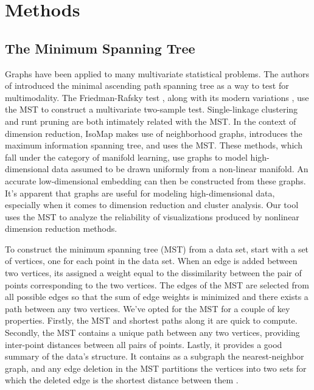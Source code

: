 \documentclass{article}
\begin{document}
\section{Methods}

\subsection{The Minimum Spanning Tree}
Graphs have been applied to many multivariate statistical problems. The authors of \cite{MAP test} introduced the minimal ascending path spanning tree as a way to test for multimodality. The Friedman-Rafsky test \cite{Friedman-Rafsky test}, along with its modern variations \cite{Friedman-Rafsky variation 1, Friedman-Rafsky variation 2, Friedman-Rafsky variation 3}, use the MST to construct a multivariate two-sample test. Single-linkage clustering \cite{single-linkage and MST} and runt pruning \cite{runt pruning} are both intimately related with the MST. In the context of dimension reduction, IsoMap \cite{IsoMap} makes use of neighborhood graphs, \cite{MIST example} introduces the maximum information spanning tree, and \cite{MST example} uses the MST. These methods, which fall under the category of manifold learning, use graphs to model high-dimensional data assumed to be drawn uniformly from a non-linear manifold. An accurate low-dimensional embedding can then be constructed from these graphs. It's apparent that graphs are useful for modeling high-dimensional data, especially when it comes to dimension reduction and cluster analysis. Our tool uses the MST to analyze the reliability of visualizations produced by nonlinear dimension reduction methods.

To construct the minimum spanning tree (MST) from a data set, start with a set of vertices, one for each point in the data set. When an edge is added between two vertices, its assigned a weight equal to the dissimilarity between the pair of points corresponding to the two vertices. The edges of the MST are selected from all possible edges so that the sum of edge weights is minimized and there exists a path between any two vertices. We've opted for the MST for a couple of key properties. Firstly, the MST and shortest paths along it are quick to compute. Secondly, the MST contains a unique path between any two vertices, providing inter-point distances between all pairs of points. Lastly, it provides a good summary of the data's structure. It contains as a subgraph the nearest-neighbor graph, and any edge deletion in the MST partitions the vertices into two sets for which the deleted edge is the shortest distance between them \cite{Friedman-Rafsky test}.
\end{document}
